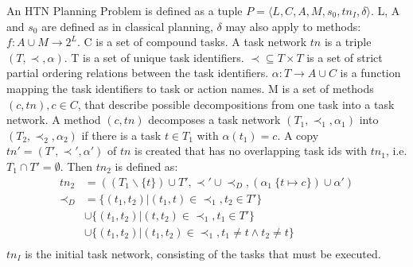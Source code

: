 An HTN Planning Problem is defined as a tuple $P=\langle L,C,A,M,s_0,tn_I,\delta \rangle$.
L, A and $s_0$ are defined as in classical planning, $\delta$ may also apply to methods: $f : A \cup M \rightarrow 2^L$.
C is a set of compound tasks.
A task network $tn$ is a triple $(T,\prec,\alpha)$.
T is a set of unique task identifiers.
$\prec \subseteq T \times T$ is a set of strict partial ordering relations between the task identifiers.
$\alpha : T \rightarrow A \cup C$ is a function mapping the task identifiers to task or action names.
M is a set of methods $(c,tn), c \in C$, that describe possible decompositions from one task into a task network.
A method $(c,tn)$ decomposes a task network $(T_1,\prec_1,\alpha_1)$ into $(T_2,\prec_2,\alpha_2)$ if there is a task $t \in T_1$ with $\alpha(t_1) = c$.
A copy $tn' = (T',\prec',\alpha')$ of $tn$ is created that has no overlapping task ids with $tn_1$, i.e. $T_1 \cap T' = \emptyset$.
Then $tn_2$ is defined as:
\begin{align*}
  tn_2 &= ((T_1 \backslash  \{t\}) \cup T', \prec' \cup \prec_D, (\alpha_1 \ \{t \mapsto c\}) \cup \alpha') \\
  \prec_D &= \{(t_1, t_2) | (t_1, t) \in \prec_1, t_2 \in T'\} \\
  &\cup \{(t_1, t_2) | (t, t_2) \in \prec_1, t_1 \in T '\} \\
  &\cup \{(t_1, t_2) | (t_1, t_2) \in \prec_1, t_1 \neq t \land t_2 \neq t\}\\
\end{align*}
$tn_I$ is the initial task network, consisting of the tasks that must be executed.


